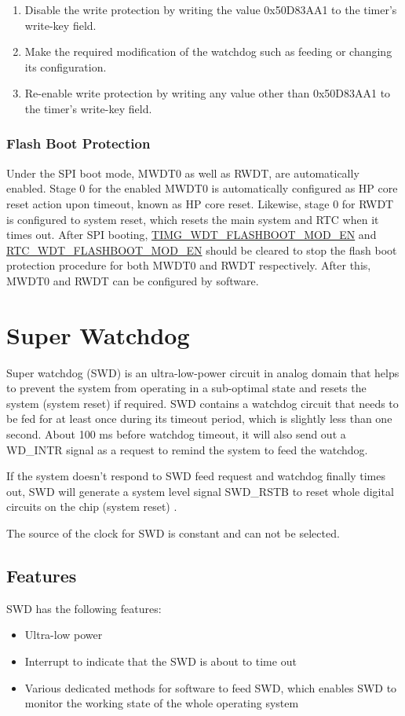 \documentclass[main\_\_EN.tex]{subfiles}
\begin{document}
\begin{enumerate}
\item Disable the write protection by writing the value 0x50D83AA1 to the timer's write-key field.
\item Make the required modification of the watchdog such as feeding or changing its configuration.
\item Re-enable write protection by writing any value other than 0x50D83AA1 to the timer's write-key field.
\end{enumerate}

\subsubsection{Flash Boot Protection}
Under the SPI boot mode, MWDT0 as well as RWDT, are automatically enabled. Stage 0 for the enabled MWDT0 is automatically configured as HP core reset action upon timeout, known as HP core reset. Likewise, stage 0 for RWDT is configured to system reset, which resets the main system and RTC when it times out. After SPI booting, \hyperref[fielddesc:TIMGWDTFLASHBOOTMODEN]{TIMG\_WDT\_FLASHBOOT\_MOD\_EN} and \hyperref[fielddesc:RTCWDTFLASHBOOTMODEN]{RTC\_WDT\_FLASHBOOT\_MOD\_EN} should be cleared to stop the flash boot protection procedure for both MWDT0 and RWDT respectively. After this, MWDT0 and RWDT can be configured by software.




\section{Super Watchdog}\label{sec:wdt-swdt}
Super watchdog (SWD) is an ultra-low-power circuit in analog domain that helps to prevent the system from operating in a sub-optimal state and resets the system (system reset) if required. SWD contains a watchdog circuit that needs to be fed for at least once during its timeout period, which is slightly less than one second. About 100 ms before watchdog timeout, it will also send out a WD\_INTR signal as a request to remind the system to feed the watchdog.

If the system doesn't respond to SWD feed request and watchdog finally times out, SWD will generate a system level signal SWD\_RSTB to reset whole digital circuits on the chip (system reset) .

The source of the clock for SWD is constant and can not be selected.

\subsection{Features}
SWD has the following features:
\begin{itemize}
    \item Ultra-low power
    \item Interrupt to indicate that the SWD is about to time out
    \item Various dedicated methods for software to feed SWD, which enables SWD to monitor the working state of the whole operating system
\end{itemize}
\end{document}
